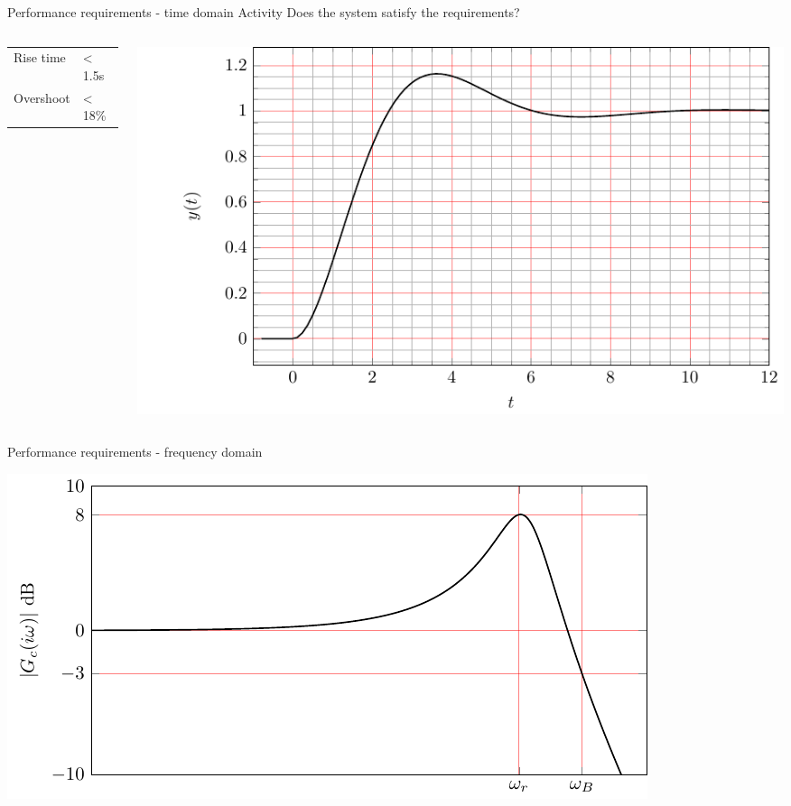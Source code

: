 \documentclass[presentation,aspectratio=169, usenames, dvipsnames]{beamer}
\begin{document}
\begin{frame}[label={sec:org4402dc5}]{Performance requirements - time domain}
\alert{Activity} Does the system satisfy the requirements?

\begin{columns}
\begin{column}{0.3\columnwidth}
\begin{center}
\begin{tabular}{ll}
Rise time & < 1.5s\\
Overshoot & < 18\%\\
\end{tabular}
\end{center}
\end{column}


\begin{column}{0.7\columnwidth}
\begin{center}
 \includegraphics[width=1.0\linewidth]{../../figures/second-order-response-example}
\end{center}
\end{column}
\end{columns}
\end{frame}
\begin{frame}[label={sec:org72943a6}]{Performance requirements - frequency domain}
\begin{center}
  \includegraphics[width=.8\linewidth]{../../figures/spec-bode-closed-loop-new}
\end{center}
\end{frame}
\end{document}
